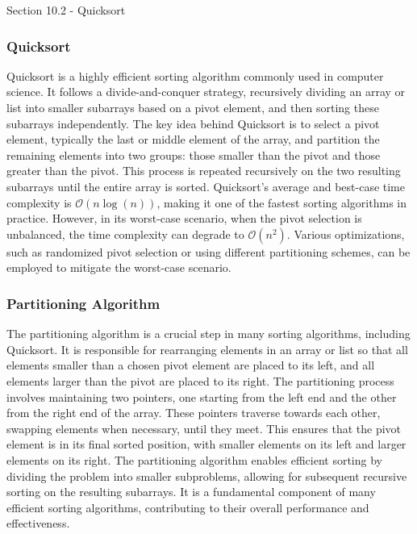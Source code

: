 \begin{notes}{Section 10.2 - Quicksort}
    \subsubsection*{Quicksort}

    Quicksort is a highly efficient sorting algorithm commonly used in computer science. It follows a divide-and-conquer strategy, recursively dividing an array or list into smaller subarrays based on a pivot element, and then sorting these subarrays independently. The key idea behind Quicksort is to select a pivot element, typically the last or middle element of the array, and partition the remaining elements into two groups: those smaller than the pivot and those greater than 
    the pivot. This process is repeated recursively on the two resulting subarrays until the entire array is sorted. Quicksort's average and best-case time complexity is $\mathcal{O}(n\log{(n)})$, making it one of the fastest sorting algorithms in practice. However, in its worst-case scenario, when the pivot selection is unbalanced, the time complexity can degrade to $\mathcal{O}(n^2)$. Various optimizations, such as randomized pivot selection or using different partitioning schemes, 
    can be employed to mitigate the worst-case scenario.
    
    \subsubsection*{Partitioning Algorithm}
    
    The partitioning algorithm is a crucial step in many sorting algorithms, including Quicksort. It is responsible for rearranging elements in an array or list so that all elements smaller than a chosen pivot element are placed to its left, and all elements larger than the pivot are placed to its right. The partitioning process involves maintaining two pointers, one starting from the left end and the other from the right end of the array. These pointers traverse towards each other, 
    swapping elements when necessary, until they meet. This ensures that the pivot element is in its final sorted position, with smaller elements on its left and larger elements on its right. The partitioning algorithm enables efficient sorting by dividing the problem into smaller subproblems, allowing for subsequent recursive sorting on the resulting subarrays. It is a fundamental component of many efficient sorting algorithms, contributing to their overall performance and effectiveness.
    

\end{notes}
